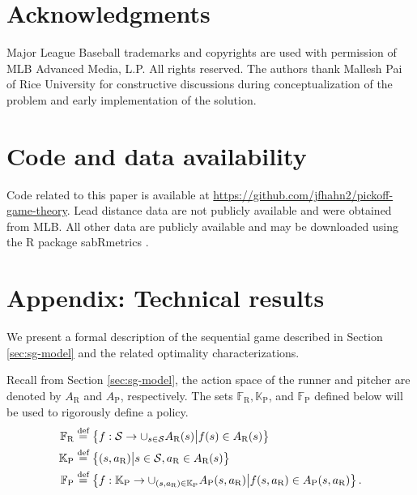\documentclass[11pt]{article}
\newcommand{\defeq}{\stackrel{\text{def}}{=}}
\begin{document}
  \section*{Acknowledgments}

    Major League Baseball trademarks and copyrights are used with permission of MLB Advanced Media, L.P. All rights reserved. The authors thank Mallesh Pai of Rice University for constructive discussions during conceptualization of the problem and early implementation of the solution.

  \section*{Code and data availability}

    Code related to this paper is available at \url{https://github.com/jfhahn2/pickoff-game-theory}. Lead distance data are not publicly available and were obtained from MLB. All other data are publicly available and may be downloaded using the R package sabRmetrics \parencite{powers_sabrmetrics_2025}.

  \printbibliography

  \newpage

  \section*{Appendix: Technical results}
    We present a formal description of the sequential game described in Section \ref{sec:sg-model} and the related optimality characterizations. 
    
    Recall from Section \ref{sec:sg-model}, the action space of the runner and pitcher are denoted by $A_{\text{R}}$ and $A_\text{P}$, respectively. The sets $\mathbb{F}_\text{R}, \mathbb{K}_\text{P}$, and $\mathbb{F}_\text{P}$ defined below will be used to rigorously define a policy. 
        \begingroup
        \allowdisplaybreaks
        \begin{align*}
            \mathbb{F}_\text{R} &\defeq \left\{f: {\cal S} \to \cup_{s \in {\cal S}}A_{\text{R}}(s) \big| f(s) \in A_{\text{R}}(s)\right\}\\
            \mathbb{K}_\text{P} &\defeq \left\{(s,a_\text{R})\big| s \in {\cal S}, a_\text{R} \in A_\text{R}(s)\right\}\\
            \mathbb{F}_\text{P} &\defeq \left\{f: \mathbb{K}_\text{P} \to \cup_{(s,a_\text{R}) \in \mathbb{K}_\text{P}} A_\text{P}(s,a_\text{R}) \big| f(s,a_\text{R}) \in A_\text{P}(s,a_\text{R})\right\}.
        \end{align*}
        \endgroup
    
\end{document}
